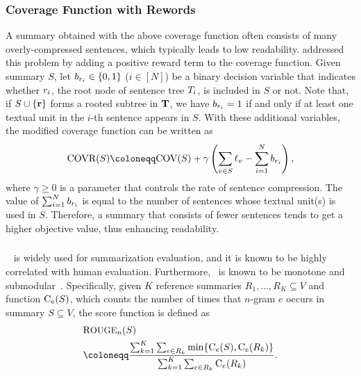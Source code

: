\documentclass[11pt,a4paper]{article}
\begin{document}
	\subsubsection*{Coverage Function with Rewords}
	A summary obtained with the above 
	coverage function often consists 
	of many overly-compressed sentences, 
	which typically leads to low readability. 
	\citet{morita2013subtree} addressed this problem 
	by adding a positive reward term to the coverage function. 
	Given summary $S$, 
	let $b_{r_i}\in\{0,1\}$ ($i\in[N]$) be 
	a binary decision variable that indicates whether 
	$r_i$,  
	the root node of sentence tree ${T}_i$, 
	is included in $S$ or not. 
	Note that, if $S\cup\{{\bf r}\}$ forms a rooted subtree in ${\bf T}$, 
	we have $b_{r_i}=1$ if and only if 
	at least one textual unit in the $i$-th sentence appears in $S$. 
	With these additional variables, 
	the modified coverage function %
	can be written as 
	\[
	\covr(S)\coloneqq\cov(S)+\gamma\left(\sum_{v\in S}\l_v - \sum_{i=1}^N b_{\rs_i}\right),
	\]
	where $\gamma\ge0$ is a parameter 
	that controls the rate of sentence compression. 
	The value of $\sum_{i=1}^N b_{r_i}$ is equal to  
	the number of sentences whose textual unit(s) is used in $S$.  
	Therefore, a summary that consists of 
	fewer sentences tends to get a higher objective value, 
	thus enhancing readability.   
	
	
	\subsubsection*{\rouge}
	\rouge~\cite{lin2004rouge} is widely used for summarization evaluation, and 
	it is known to be highly correlated with human evaluation. 
	Furthermore, \rouge\ is known to be monotone and submodular~\cite{lin2011class}. 
	Specifically, 
	given $K$ reference summaries $R_1,\dots,R_K\subseteq V$ and function $\text{C}_e(S)$, 
	which counts the number of times that $n$-gram $e$ occurs in summary $S\subseteq V$, 
	the  score function is defined as  
	\begin{align}
		&\rougei{n}(S) \\
		&\coloneqq \frac{\sum_{k=1}^K\sum_{e\in R_k} \min\{\countn_e(S),\countn_e(R_k)  \} }{ \sum_{k=1}^K\sum_{e\in R_k} \countn_e (R_k) }. \label{def_rougen}
	\end{align}
	
\end{document}

